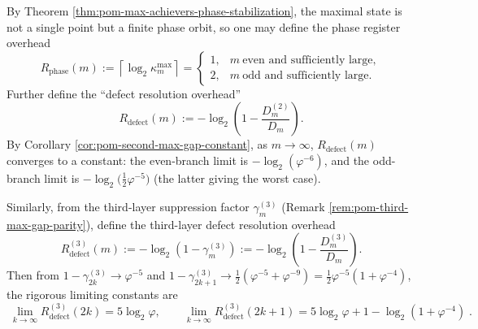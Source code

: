 \begin{remark}\label{rem:pom-phase-defect-resource-meters}
By Theorem \ref{thm:pom-max-achievers-phase-stabilization}, the maximal state is not a single point but a finite phase orbit, so one may define the phase register overhead
\[
R_{\mathrm{phase}}(m):=\left\lceil \log_2 \kappa_m^{\mathrm{max}}\right\rceil
=
\begin{cases}
1,& m\ \text{even and sufficiently large},\\
2,& m\ \text{odd and sufficiently large}.
\end{cases}
\]
Further define the ``defect resolution overhead''
\[
R_{\mathrm{defect}}(m):=-\log_2\!\left(1-\frac{D_m^{(2)}}{D_m}\right).
\]
By Corollary \ref{cor:pom-second-max-gap-constant}, as \(m\to\infty\), \(R_{\mathrm{defect}}(m)\) converges to a constant: the even-branch limit is \(-\log_2(\varphi^{-6})\), and the odd-branch limit is \(-\log_2\!\bigl(\tfrac12\varphi^{-5}\bigr)\) (the latter giving the worst case).
\par
Similarly, from the third-layer suppression factor \(\gamma_m^{(3)}\) (Remark \ref{rem:pom-third-max-gap-parity}), define the third-layer defect resolution overhead
\[
R_{\mathrm{defect}}^{(3)}(m)
:=-\log_2\!\left(1-\gamma_m^{(3)}\right)
:=-\log_2\!\left(1-\frac{D_m^{(3)}}{D_m}\right).
\]
Then from
\(
1-\gamma_{2k}^{(3)}\to \varphi^{-5}
\)
and
\(
1-\gamma_{2k+1}^{(3)}\to \tfrac12(\varphi^{-5}+\varphi^{-9})=\tfrac12\varphi^{-5}(1+\varphi^{-4})
\),
the rigorous limiting constants are
\[
\boxed{\;
\lim_{k\to\infty}R_{\mathrm{defect}}^{(3)}(2k)=5\log_2\varphi,\qquad
\lim_{k\to\infty}R_{\mathrm{defect}}^{(3)}(2k+1)=5\log_2\varphi+1-\log_2(1+\varphi^{-4})\; }.
\]
\end{remark}

